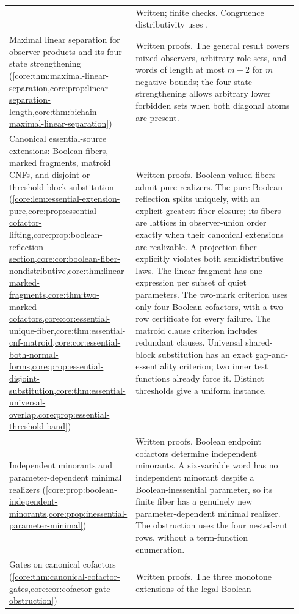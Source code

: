 {\begin{longtable}{>{\raggedright\arraybackslash}p{0.34\linewidth}>{\raggedright\arraybackslash}p{0.60\linewidth}}
 & Written; finite checks. Congruence distributivity uses \cite{Mitschke1978}.\\
Maximal linear separation for observer products and its four-state strengthening
(\cref{core:thm:maximal-linear-separation,core:prop:linear-separation-length,core:thm:bichain-maximal-linear-separation})
 & Written proofs. The general result covers mixed observers, arbitrary
role sets, and words of length at most $m+2$ for $m$ negative bounds;
the four-state strengthening allows arbitrary lower forbidden
sets when both diagonal atoms are present.\\
Canonical essential-source extensions: Boolean fibers, marked fragments, matroid CNFs,
and disjoint or threshold-block substitution
 (\cref{core:lem:essential-extension-pure,core:prop:essential-cofactor-lifting,core:prop:boolean-reflection-section,core:cor:boolean-fiber-nondistributive,core:thm:linear-marked-fragments,core:thm:two-marked-cofactors,core:cor:essential-unique-fiber,core:thm:essential-cnf-matroid,core:cor:essential-both-normal-forms,core:prop:essential-disjoint-substitution,core:thm:essential-universal-overlap,core:prop:essential-threshold-band})
 & Written proofs. Boolean-valued fibers admit pure realizers. The pure
Boolean reflection splits uniquely, with an explicit greatest-fiber closure;
its fibers are lattices in observer-union order exactly when their
canonical extensions are realizable.
A projection fiber explicitly violates both semidistributive laws.
The linear fragment has one expression per subset of
quiet parameters. The two-mark criterion uses only four Boolean cofactors,
with a two-row certificate for every failure.
The matroid clause criterion includes redundant clauses. Universal
shared-block substitution has an exact gap-and-essentiality criterion;
two inner test functions already force it. Distinct thresholds give a
uniform instance.\\
Independent minorants and parameter-dependent minimal realizers
(\cref{core:prop:boolean-independent-minorants,core:prop:inessential-parameter-minimal})
 & Written proofs. Boolean endpoint cofactors determine independent
minorants. A six-variable word has no independent minorant despite a
Boolean-inessential parameter, so its finite fiber has a genuinely new
parameter-dependent minimal realizer. The obstruction uses the four nested-cut
rows, without a term-function enumeration.\\
Gates on canonical cofactors
(\cref{core:thm:canonical-cofactor-gates,core:cor:cofactor-gate-obstruction})
 & Written proofs. The three monotone extensions of the legal Boolean

\end{longtable}}
